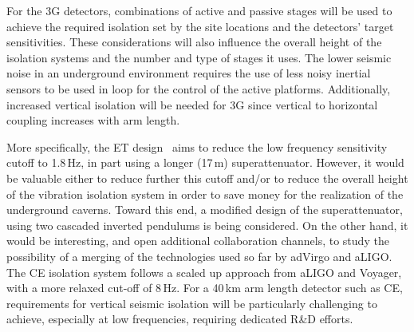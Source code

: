 
 For the 3G detectors, combinations of active and passive stages will be used to achieve the required isolation set by the site locations and the detectors' target sensitivities.
These considerations will also influence the overall height of the isolation systems and the number and type of stages it uses.
The lower seismic noise in an underground environment requires the use of less noisy inertial sensors to be used in loop for the control of the active platforms.
Additionally, increased vertical isolation will be needed for 3G since vertical to horizontal coupling increases with arm length. 

More specifically, the ET design~\cite{ET2011} aims to reduce the low frequency sensitivity cutoff to 1.8\,Hz, in part using a longer (17\,m) superattenuator. However, it would be valuable either to reduce further this cutoff and/or to reduce the overall height of the vibration isolation system in order to save money for the realization of the underground caverns. Toward this end, a modified design of the superattenuator, using two cascaded inverted pendulums is being considered. On the other hand, it would be interesting, and open additional collaboration channels, to study the possibility of a merging of the technologies used so far by adVirgo and aLIGO. 
The CE isolation system follows a scaled up approach from aLIGO and Voyager, with a more relaxed cut-off of 8\,Hz. For a 40\,km arm length detector such as CE, requirements for vertical seismic isolation will be particularly challenging to achieve, especially at low frequencies, requiring dedicated R\&D efforts.

